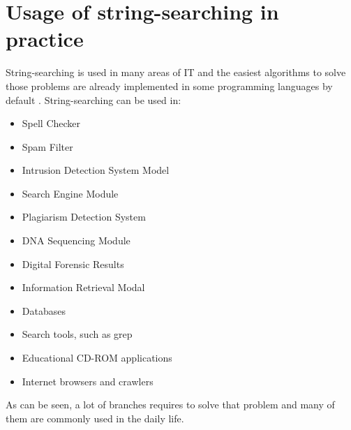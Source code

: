 \section{Usage of string-searching in practice}
String-searching is used in many areas of IT and the easiest algorithms to solve those problems are already implemented in some programming languages by default \cite{stringSearchingUsage} \cite{Gusfield1997AlgorithmsOS}. String-searching can be used in:
\begin{itemize}
    \item Spell Checker
    \item Spam Filter
    \item Intrusion Detection System Model 
    \item Search Engine Module
    \item Plagiarism Detection System
    \item DNA Sequencing Module
    \item Digital Forensic Results
    \item Information Retrieval Modal
    \item Databases
    \item Search tools, such as grep
    \item Educational CD-ROM applications
    \item Internet browsers and crawlers
\end{itemize}

As can be seen, a lot of branches requires to solve that problem and many of them are commonly used in the daily life. 